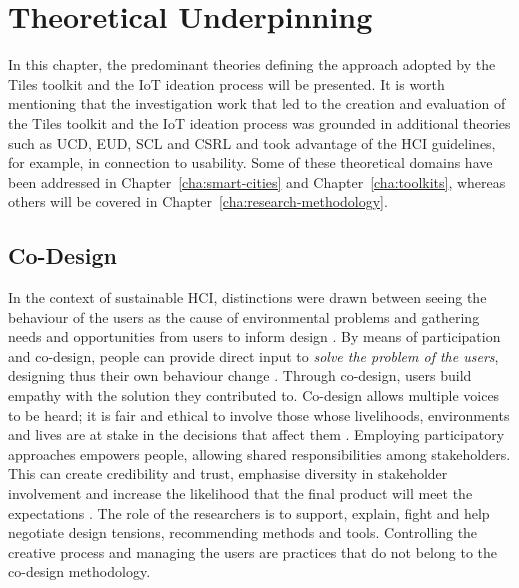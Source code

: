 \chapter{Theoretical Underpinning}
\label{cha:theory}


In this chapter, the predominant theories defining the approach adopted by the Tiles toolkit and the IoT ideation process will be presented. It is worth mentioning that the investigation work that led to the creation and evaluation of the Tiles toolkit and the IoT ideation process was grounded in additional theories such as UCD, EUD, SCL and CSRL and took advantage of the HCI guidelines, for example, in connection to usability. Some of these theoretical domains have been addressed in Chapter~\ref{cha:smart-cities} and Chapter~\ref{cha:toolkits}, whereas others will be covered in Chapter~\ref{cha:research-methodology}.


\section{Co-Design}

In the context of sustainable HCI, distinctions were drawn between seeing the behaviour of the users as the cause of environmental problems and gathering needs and opportunities from users to inform design \autocite{disalvo_mapping_2010}. By means of participation and co-design, people can provide direct input to \textit{solve the problem of the users}, designing thus their own behaviour change \autocite{lockton_designing_2014}.
Through co-design, users build empathy with the solution they contributed to. Co-design allows multiple voices to be heard; it is fair and ethical to involve those whose livelihoods, environments and lives are at stake in the decisions that affect them \autocite{perlgut_community_2005}.
Employing participatory approaches empowers people, allowing shared responsibilities among stakeholders. This can create credibility and trust, emphasise diversity in stakeholder involvement and increase the likelihood that the final product will meet the expectations \autocite{pettersen_ethics_2008}. The role of the researchers is to support, explain, fight and help negotiate design tensions, recommending methods and tools. Controlling the creative process and managing the users are practices that do not belong to the co-design methodology.

